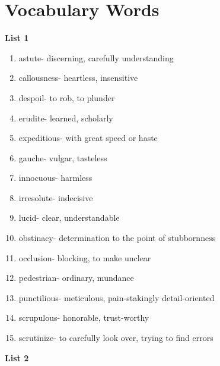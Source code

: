 \section{Vocabulary Words}

\textbf{List 1}

\begin{enumerate}

\item astute- discerning, carefully understanding

\item callousness- heartless, insensitive

\item despoil- to rob, to plunder

\item erudite- learned, scholarly 

\item expeditious- with great speed or haste

\item gauche- vulgar, tasteless

\item innocuous- harmless

\item irresolute- indecisive

\item lucid- clear, understandable

\item obstinacy- determination to the point of stubbornness 

\item occlusion- blocking, to make unclear

\item pedestrian- ordinary, mundance

\item punctilious- meticulous, pain-stakingly detail-oriented

\item scrupulous- honorable, trust-worthy

\item scrutinize- to carefully look over, trying to find errors

\end{enumerate}

\textbf{List 2}

